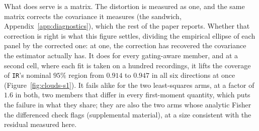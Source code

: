 What does serve is a matrix. The distortion is measured as one, and the same matrix corrects the
covariance it measures (the sandwich, Appendix~\ref{app:diagnostics}), which the rest of
the paper reports. Whether that correction is right is what this figure settles, dividing the
empirical ellipse of each panel by the corrected one: at one, the correction has recovered the
covariance the estimator actually has. It does for every gating-aware member, and at a second cell,
where each fit is taken on a hundred recordings, it lifts the coverage of \texttt{IR}'s nominal
$95\%$ region from $0.914$ to $0.947$ in all six
directions at once (Figure~\ref{fig:clouds-s1}).
It fails alike for the two least-squares arms, at a factor of $1.6$ in both, two members that differ
in every first-moment quantity, which puts the failure in what they share; they are also the two
arms whose analytic Fisher the differenced check flags (supplemental material), at a size consistent
with the residual measured here.

